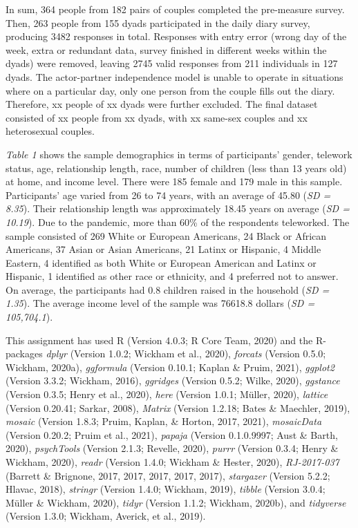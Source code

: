 \documentclass[
  english,
  man]{apa6}
\begin{document}
In sum, 364 people from 182 pairs of couples completed the pre-measure survey. Then, 263 people from 155 dyads participated in the daily diary survey, producing 3482 responses in total. Responses with entry error (wrong day of the week, extra or redundant data, survey finished in different weeks within the dyads) were removed, leaving 2745 valid responses from 211 individuals in 127 dyads. The actor-partner independence model is unable to operate in situations where on a particular day, only one person from the couple fills out the diary. Therefore, xx people of xx dyads were further excluded. The final dataset consisted of xx people from xx dyads, with xx same-sex couples and xx heterosexual couples.

\emph{Table 1} shows the sample demographics in terms of participants' gender, telework status, age, relationship length, race, number of children (less than 13 years old) at home, and income level. There were 185 female and 179 male in this sample. Participants' age varied from 26 to 74 years, with an average of 45.80 (\emph{SD = 8.35}). Their relationship length was approximately 18.45 years on average (\emph{SD = 10.19}). Due to the pandemic, more than 60\% of the respondents teleworked. The sample consisted of 269 White or European Americans, 24 Black or African Americans, 37 Asian or Asian Americans, 21 Latinx or Hispanic, 4 Middle Eastern, 4 identified as both White or European American and Latinx or Hispanic, 1 identified as other race or ethnicity, and 4 preferred not to answer. On average, the participants had 0.8 children raised in the household (\emph{SD = 1.35}). The average income level of the sample was 76618.8 dollars (\emph{SD = 105,704.1}).

\hfill\break
\hfill\break
This assignment has used R (Version 4.0.3; R Core Team, 2020) and the R-packages \emph{dplyr} (Version 1.0.2; Wickham et al., 2020), \emph{forcats} (Version 0.5.0; Wickham, 2020a), \emph{ggformula} (Version 0.10.1; Kaplan \& Pruim, 2021), \emph{ggplot2} (Version 3.3.2; Wickham, 2016), \emph{ggridges} (Version 0.5.2; Wilke, 2020), \emph{ggstance} (Version 0.3.5; Henry et al., 2020), \emph{here} (Version 1.0.1; Müller, 2020), \emph{lattice} (Version 0.20.41; Sarkar, 2008), \emph{Matrix} (Version 1.2.18; Bates \& Maechler, 2019), \emph{mosaic} (Version 1.8.3; Pruim, Kaplan, \& Horton, 2017, 2021), \emph{mosaicData} (Version 0.20.2; Pruim et al., 2021), \emph{papaja} (Version 0.1.0.9997; Aust \& Barth, 2020), \emph{psychTools} (Version 2.1.3; Revelle, 2020), \emph{purrr} (Version 0.3.4; Henry \& Wickham, 2020), \emph{readr} (Version 1.4.0; Wickham \& Hester, 2020), \emph{RJ-2017-037} (Barrett \& Brignone, 2017, 2017, 2017, 2017, 2017), \emph{stargazer} (Version 5.2.2; Hlavac, 2018), \emph{stringr} (Version 1.4.0; Wickham, 2019), \emph{tibble} (Version 3.0.4; Müller \& Wickham, 2020), \emph{tidyr} (Version 1.1.2; Wickham, 2020b), and \emph{tidyverse} (Version 1.3.0; Wickham, Averick, et al., 2019).
\end{document}
